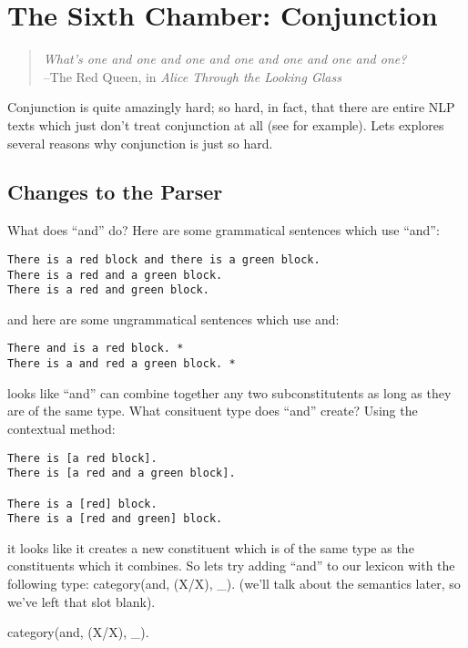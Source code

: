 \documentclass{book}[9pt]
\newenvironment{code}%
{\small \verbatim}%
{\endverbatim \large}
\begin{document}
\chapter{The Sixth Chamber: Conjunction}

\begin{quote}
{\em What's one and one and one and one and one and one and one? \\ }  --The Red
Queen, in {\em Alice Through the Looking Glass}
\end{quote}

Conjunction is quite amazingly hard; so hard, in fact, that there are
entire NLP texts which just don't treat conjunction at all (see
\cite{allen} for example).  Lets explores several reasons why
conjunction is just so hard.

\section{Changes to the Parser}

What does ``and'' do?  Here are some grammatical sentences which use ``and'':
\begin{verbatim}
There is a red block and there is a green block.
There is a red and a green block.
There is a red and green block.
\end{verbatim}
\noindent and here are some ungrammatical sentences which use and:
\begin{verbatim}
There and is a red block. *
There is a and red a green block. *
\end{verbatim}
\noindent looks like ``and'' can combine together any two
subconstitutents as long as they are of the same type.  What consituent
type does ``and'' create?  Using the contextual method:
\begin{verbatim}
There is [a red block].
There is [a red and a green block].

There is a [red] block.
There is a [red and green] block.
\end{verbatim}
\noindent it looks like it creates a new constituent which is of the same
type as the constituents which it combines.  So lets try adding ``and'' to our
lexicon with the following type:
\begin{code}
category(and, (X\X/X), _).
\end{code}
\noindent (we'll talk about the semantics later, so we've left that slot blank).


\begin{code}
category(and, (X\X/X), _).
\end{code}
\end{document}
